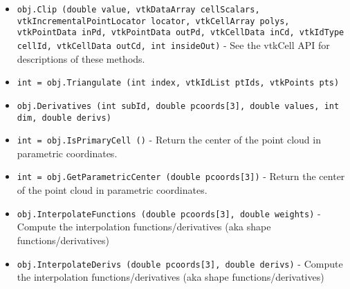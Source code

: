 \begin{itemize}
\item  \verb|obj.Clip (double value, vtkDataArray cellScalars, vtkIncrementalPointLocator locator, vtkCellArray polys, vtkPointData inPd, vtkPointData outPd, vtkCellData inCd, vtkIdType cellId, vtkCellData outCd, int insideOut)| -  See the vtkCell API for descriptions of these methods.

\item  \verb|int = obj.Triangulate (int index, vtkIdList ptIds, vtkPoints pts)|

\item  \verb|obj.Derivatives (int subId, double pcoords[3], double values, int dim, double derivs)|

\item  \verb|int = obj.IsPrimaryCell ()| -  Return the center of the point cloud in parametric coordinates.

\item  \verb|int = obj.GetParametricCenter (double pcoords[3])| -  Return the center of the point cloud in parametric coordinates.

\item  \verb|obj.InterpolateFunctions (double pcoords[3], double weights)| -  Compute the interpolation functions/derivatives
 (aka shape functions/derivatives)

\item  \verb|obj.InterpolateDerivs (double pcoords[3], double derivs)| -  Compute the interpolation functions/derivatives
 (aka shape functions/derivatives)

\end{itemize}

